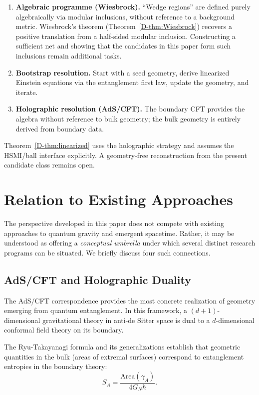 \documentclass[12pt,a4paper,openany]{book}
\begin{document}
\begin{enumerate}
\item[(A)] \textbf{Algebraic programme (Wiesbrock).}
``Wedge regions'' are defined purely algebraically via modular inclusions, without reference to a background metric.
Wiesbrock's theorem (Theorem~\ref{D-thm:Wiesbrock}) recovers a positive translation from a half-sided modular inclusion.  Constructing a sufficient net and showing that the candidates in this paper form such inclusions remain additional tasks.

\item[(B)] \textbf{Bootstrap resolution.}
Start with a seed geometry, derive linearized Einstein equations via the entanglement first law, update the geometry, and iterate.

\item[(C)] \textbf{Holographic resolution (AdS/CFT).}
The boundary CFT provides the algebra without reference to bulk geometry; the bulk geometry is entirely derived from boundary data.
\end{enumerate}

Theorem~\ref{D-thm:linearized} uses the holographic strategy and assumes the HSMI/ball interface explicitly.  A geometry-free reconstruction from the present candidate class remains open.


\section{Relation to Existing Approaches}
\label{D-sec:relation}

The perspective developed in this paper does not compete with existing approaches to quantum gravity and emergent spacetime. Rather, it may be understood as offering a \emph{conceptual umbrella} under which several distinct research programs can be situated. We briefly discuss four such connections.

\subsection{AdS/CFT and Holographic Duality}

The AdS/CFT correspondence \cite{Maldacena1999} provides the most concrete realization of geometry emerging from quantum entanglement. In this framework, a $(d+1)$-dimensional gravitational theory in anti-de Sitter space is dual to a $d$-dimensional conformal field theory on its boundary.

The Ryu-Takayanagi formula \cite{RyuTakayanagi2006} and its generalizations establish that geometric quantities in the bulk (areas of extremal surfaces) correspond to entanglement entropies in the boundary theory:
\begin{equation}
S_A = \frac{\text{Area}(\gamma_A)}{4 G_N \hbar}.
\end{equation}
\end{document}
